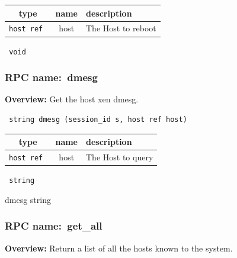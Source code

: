  
\vspace{0.3cm}
\begin{tabular}{|c|c|p{7cm}|}
 \hline
{\bf type} & {\bf name} & {\bf description} \\ \hline
{\tt host ref } & host & The Host to reboot \\ \hline 

\end{tabular}

\vspace{0.3cm}

{\tt 
void
}



\vspace{0.3cm}
\vspace{0.3cm}
\vspace{0.3cm}
\subsubsection{RPC name:~dmesg}

{\bf Overview:} 
Get the host xen dmesg.

\begin{verbatim} string dmesg (session_id s, host ref host)\end{verbatim}



 
\vspace{0.3cm}
\begin{tabular}{|c|c|p{7cm}|}
 \hline
{\bf type} & {\bf name} & {\bf description} \\ \hline
{\tt host ref } & host & The Host to query \\ \hline 

\end{tabular}

\vspace{0.3cm}

{\tt 
string
}


dmesg string
\vspace{0.3cm}
\vspace{0.3cm}
\vspace{0.3cm}
\subsubsection{RPC name:~get\_all}

{\bf Overview:} 
Return a list of all the hosts known to the system.

